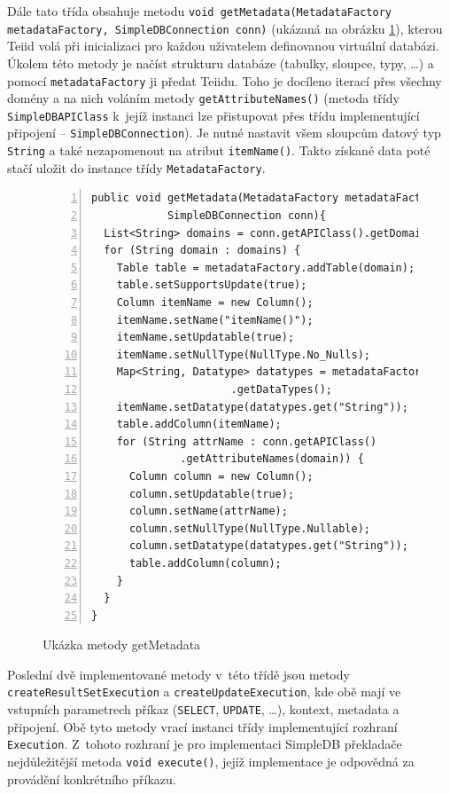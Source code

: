 \documentclass[oneside,12pt,final]{fithesis2}
\begin{document}
Dále tato třída obsahuje metodu \texttt{void getMetadata(Metadata\allowbreak Factory metadataFactory, SimpleDBConnection conn)} (ukázaná na obrázku \ref{getMetadata}), kterou Teiid volá při inicializaci pro každou uživatelem definovanou virtuální databázi. Úkolem této metody je načíst strukturu databáze (tabulky, sloupce, typy, \dots) a pomocí \texttt{metadataFactory} ji předat Teiidu. Toho je docíleno iterací přes všechny domény a na nich voláním metody \texttt{getAttributeNames()} (metoda třídy \texttt{SimpleDBAPIClass} k~jejíž instanci lze přistupovat přes třídu implementující připojení -- \texttt{SimpleDB\allowbreak Connection}). Je nutné nastavit všem sloupcům datový typ \texttt{String} a také nezapomenout na atribut \texttt{itemName()}. Takto získané data poté stačí uložit do instance třídy \texttt{MetadataFactory}.

\begin{figure}[h]
 \begin{Verbatim}[fontsize=\small,numbers=left]
public void getMetadata(MetadataFactory metadataFactory, 
			SimpleDBConnection conn){
  List<String> domains = conn.getAPIClass().getDomains();
  for (String domain : domains) {
    Table table = metadataFactory.addTable(domain);
    table.setSupportsUpdate(true);
    Column itemName = new Column();
    itemName.setName("itemName()");
    itemName.setUpdatable(true);
    itemName.setNullType(NullType.No_Nulls);
    Map<String, Datatype> datatypes = metadataFactory
				      .getDataTypes();
    itemName.setDatatype(datatypes.get("String"));
    table.addColumn(itemName);
    for (String attrName : conn.getAPIClass()
			  .getAttributeNames(domain)) {
      Column column = new Column();
      column.setUpdatable(true);
      column.setName(attrName);
      column.setNullType(NullType.Nullable);
      column.setDatatype(datatypes.get("String"));
      table.addColumn(column);
    }
  }
}
 \end{Verbatim}
\label{getMetadata}
\caption{Ukázka metody getMetadata}
\end{figure}

Poslední dvě implementované metody v~této třídě jsou metody \texttt{createResultSetExecution} a \texttt{createUpdateExecution}, kde obě mají ve vstupních parametrech příkaz (\texttt{SELECT}, \texttt{UPDATE}, \dots), kontext, metadata a připojení. Obě tyto metody vrací instanci třídy implementující rozhraní \texttt{Execution}. Z~tohoto rozhraní je pro implementaci SimpleDB překladače nejdůležitější metoda \texttt{void execute()}, jejíž implementace je odpovědná za provádění konkrétního příkazu.
\end{document}
